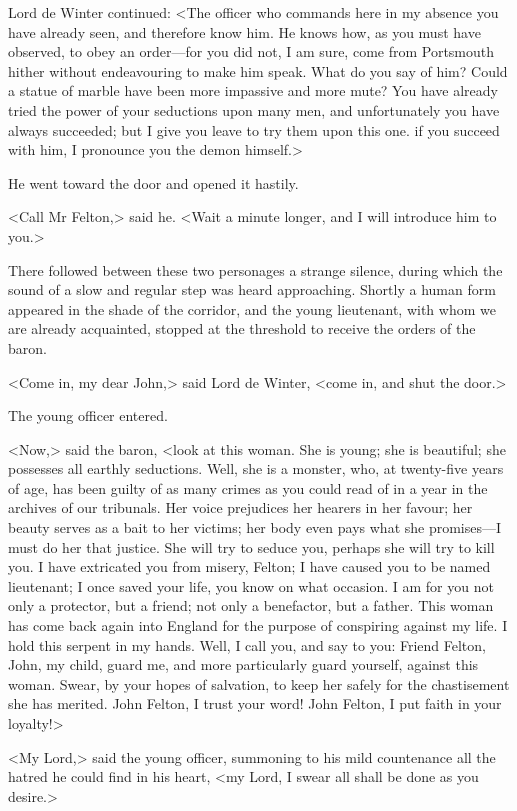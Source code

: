 Lord de Winter continued: <The officer who commands here in my absence you have already seen, and therefore know him. He knows how, as you must have observed, to obey an order—for you did not, I am sure, come from Portsmouth hither without endeavouring to make him speak. What do you say of him? Could a statue of marble have been more impassive and more mute? You have already tried the power of your seductions upon many men, and unfortunately you have always succeeded; but I give you leave to try them upon this one.  if you succeed with him, I pronounce you the demon himself.> 

He went toward the door and opened it hastily. 

<Call Mr Felton,> said he. <Wait a minute longer, and I will introduce him to you.> 

There followed between these two personages a strange silence, during which the sound of a slow and regular step was heard approaching. Shortly a human form appeared in the shade of the corridor, and the young lieutenant, with whom we are already acquainted, stopped at the threshold to receive the orders of the baron. 

<Come in, my dear John,> said Lord de Winter, <come in, and shut the door.> 

The young officer entered. 

<Now,> said the baron, <look at this woman. She is young; she is beautiful; she possesses all earthly seductions. Well, she is a monster, who, at twenty-five years of age, has been guilty of as many crimes as you could read of in a year in the archives of our tribunals. Her voice prejudices her hearers in her favour; her beauty serves as a bait to her victims; her body even pays what she promises—I must do her that justice. She will try to seduce you, perhaps she will try to kill you. I have extricated you from misery, Felton; I have caused you to be named lieutenant; I once saved your life, you know on what occasion. I am for you not only a protector, but a friend; not only a benefactor, but a father. This woman has come back again into England for the purpose of conspiring against my life. I hold this serpent in my hands. Well, I call you, and say to you: Friend Felton, John, my child, guard me, and more particularly guard yourself, against this woman. Swear, by your hopes of salvation, to keep her safely for the chastisement she has merited. John Felton, I trust your word! John Felton, I put faith in your loyalty!> 

<My Lord,> said the young officer, summoning to his mild countenance all the hatred he could find in his heart, <my Lord, I swear all shall be done as you desire.> 

